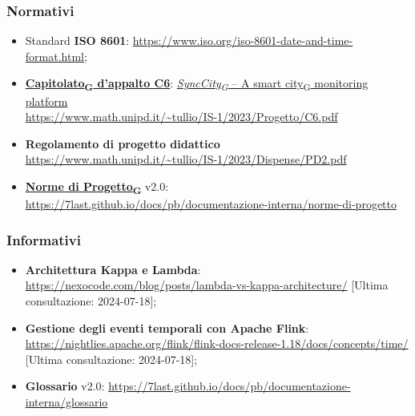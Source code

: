\subsubsection{Normativi} %
\begin{itemize}
	\item Standard \textbf{ISO 8601}: \url{https://www.iso.org/iso-8601-date-and-time-format.html};
	\item \href{https://7last.github.io/docs/rtb/documentazione-interna/glossario\#capitolato}{\textbf{Capitolato\textsubscript{G} d'appalto C6}}: \href{https://7last.github.io/docs/rtb/documentazione-interna/glossario\#synccity}{\textit{SyncCity\textsubscript{G} } – A \href{https://7last.github.io/docs/rtb/documentazione-interna/glossario\#smart-city}{smart city\textsubscript{G}} monitoring platform}\\
	      \url{https://www.math.unipd.it/~tullio/IS-1/2023/Progetto/C6.pdf}
	\item \textbf{Regolamento di progetto didattico}\\
	      \url{https://www.math.unipd.it/~tullio/IS-1/2023/Dispense/PD2.pdf}
	\item \href{https://7last.github.io/docs/rtb/documentazione-interna/glossario\#norme-di-progetto}{\textbf{Norme di Progetto\textsubscript{G}}} v2.0:\\
	      \url{https://7last.github.io/docs/pb/documentazione-interna/norme-di-progetto}
\end{itemize}
\subsubsection{Informativi}
\begin{itemize}
	\item \textbf{Architettura Kappa e Lambda}: \\\url{https://nexocode.com/blog/posts/lambda-vs-kappa-architecture/} [Ultima consultazione: 2024-07-18];
	\item \textbf{Gestione degli eventi temporali con Apache Flink}: \url{https://nightlies.apache.org/flink/flink-docs-release-1.18/docs/concepts/time/} [Ultima consultazione: 2024-07-18];
	\item \textbf{Glossario} v2.0: \url{https://7last.github.io/docs/pb/documentazione-interna/glossario}
\end{itemize}
